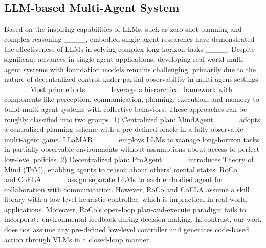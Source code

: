 \subsection{LLM-based Multi-Agent System}
Based on the inspiring capabilities of LLMs, such as zero-shot planning and complex reasoning ____, embodied single-agent researches have demonstrated the effectiveness of LLMs in solving complex long-horizon tasks ____. 
Despite significant advances in single-agent applications, developing real-world multi-agent systems with foundation models remains challenging, primarily due to the nature of decentralized control under partial observability in multi-agent settings ____. 
Most prior efforts ____ leverage a hierarchical framework with components like perception, communication, planning, execution, and memory to build multi-agent systems with collective behaviors. These approaches can be roughly classified into two groups. 1) Centralized plan: MindAgent ____ adopts a centralized planning scheme with a pre-defined oracle in a fully observable multi-agent game. LLaMAR ____ employs LLMs to manage long-horizon tasks in partially observable environments without assumptions about access to perfect low-level policies. 2) Decentralized plan: ProAgent ____ introduces Theory of Mind (ToM), enabling agents to reason about others’ mental states. RoCo ____ and CoELA ____ assign separate LLMs to each embodied agent for collaboration with communication. However, RoCo and CoELA assume a skill library with a low-level heuristic controller, which is impractical in real-world applications. Moreover, RoCo's open-loop plan-and-execute paradigm fails to incorporate environmental feedback during decision-making. In contrast, our work does not assume any pre-defined low-level controller and generates code-based action through VLMs in a closed-loop manner.